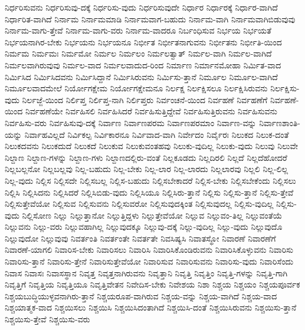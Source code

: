 {ನಿರ್ಧರಿಸುವನು
ನಿರ್ಧರಿಸುವು-ದಕ್ಕೆ
ನಿರ್ಧರಿಸು-ವುದು
ನಿರ್ಧರಿಸುವುದೇ
ನಿರ್ಧಾರ
ನಿರ್ಧಾರಕ್ಕೆ
ನಿರ್ಧಾರ-ವಾಗಿದೆ
ನಿರ್ಧಾರಿತ-ವಾಗಿದೆ
ನಿರ್ನಾಮ
ನಿರ್ನಾಮಮಾಡಿ
ನಿರ್ನಾಮವಾಗ-ಬಹುದು
ನಿರ್ನಾಮ-ವಾಗಿ
ನಿರ್ನಾಮವಾಗಿಬಿಡುವುವು
ನಿರ್ನಾಮ-ವಾಗು-ತ್ತೇವೆ
ನಿರ್ನಾಮ-ವಾಗು-ವರು
ನಿರ್ನಾಮ-ವಾದರೂ
ನಿರ್ಬಂಧಿಸುವ
ನಿರ್ಭಯ
ನಿರ್ಭಯತೆ
ನಿರ್ಭಯನಾಗಿರ-ಬೇಕು
ನಿರ್ಭಯನು
ನಿರ್ಭಯನೂ
ನಿರ್ಭೀತ
ನಿರ್ಭೀತನಾಗುವನು
ನಿರ್ಭೀತನು
ನಿರ್ಭೀತಿ-ಯಿಂದ
ನಿರ್ಮಮ
ನಿರ್ಮಮಃ
ನಿರ್ಮಮೋ
ನಿರ್ಮಲ
ನಿರ್ಮಲಂ
ನಿರ್ಮಲತ್ವಾತ್
ನಿರ್ಮಲ-ವಾಗಿ
ನಿರ್ಮಲ-ವಾಗಿದೆ
ನಿರ್ಮಲವಾಗಿರುವುವು
ನಿರ್ಮಲ-ವಾದ
ನಿರ್ಮಲವಾದುದ-ರಿಂದ
ನಿರ್ಮಾಣ
ನಿರ್ಮಾನಮೋಹಾ
ನಿರ್ಮಿತ-ವಾದ
ನಿರ್ಮಿಸಿದ
ನಿರ್ಮಿಸಿದವನು
ನಿರ್ಮಿಸಿದ್ದಾನೆ
ನಿರ್ಮಿಸಿರುವನು
ನಿರ್ಮಿಸು-ತ್ತಾನೆ
ನಿರ್ಮೂಲ
ನಿರ್ಮೂಲ-ವಾಗಿದೆ
ನಿರ್ಮೂಲವಾದಮೇಲೆ
ನಿರ್ಯೋಗಕ್ಷೇಮ
ನಿರ್ಯೋಗಕ್ಷೇಮನೂ
ನಿರ್ಲಕ್ಷ
ನಿರ್ಲಕ್ಷಿಸಲೂ
ನಿರ್ಲಕ್ಷಿಸಿರುವನು
ನಿರ್ಲಕ್ಷಿಸು-ವುದು
ನಿರ್ಲಜ್ಜೆ-ಯಿಂದ
ನಿರ್ಲಿಪ್ತ
ನಿರ್ಲಿಪ್ತ-ನಾಗಿ
ನಿರ್ಲಿಪ್ತರು
ನಿರ್ವಂಚನೆ-ಯಿಂದ
ನಿರ್ವಹಣೆ
ನಿರ್ವಹಣೆಗೆ
ನಿರ್ವಹಣೆ-ಯಿಂದ
ನಿರ್ವಹಣೆಯೇ
ನಿರ್ವಹಿಸಲಿ
ನಿರ್ವಹಿಸಿದರೆ
ನಿರ್ವಹಿಸುತ್ತಿದ್ದೇವೆ
ನಿರ್ವಹಿಸುತ್ತಿರುವನು
ನಿರ್ವಹಿಸುವನು
ನಿರ್ವಹಿಸು-ವರು
ನಿರ್ವಹಿಸುವು-ದಕ್ಕೆ
ನಿರ್ವಾಣ
ನಿರ್ವಾಣಪರಮ
ನಿರ್ವಾಣಪರಮಾಂ
ನಿರ್ವಾಣ-ವನ್ನು
ನಿರ್ವಾಣಶಾಂತಿ-ಯನ್ನು
ನಿರ್ವಾಹವಿಲ್ಲದೆ
ನಿರ್ವಿಕಲ್ಪ
ನಿರ್ವಿಕಾರನೂ
ನಿರ್ವಿವಾದ-ವಾಗಿ
ನಿರ್ವೇದಂ
ನಿರ್ವೈರಃ
ನಿಲುಕದ
ನಿಲುಕ-ದಂತೆ
ನಿಲುಕದವನು
ನಿಲುಕದುದೆ
ನಿಲುಕದೆ
ನಿಲುಕುವ
ನಿಲುಕುವಂತಹವು
ನಿಲುಕು-ವುದಿಲ್ಲ
ನಿಲುಕು-ವುದು
ನಿಲುವು
ನಿಲುವೇ
ನಿಲ್ದಾಣ
ನಿಲ್ದಾಣ-ಗಳನ್ನು
ನಿಲ್ದಾಣ-ಗಳು
ನಿಲ್ದಾಣದಲ್ಲಿರು-ವಂತೆ
ನಿಲ್ಲಕೂಡದು
ನಿಲ್ಲದಿರಲಿ
ನಿಲ್ಲದೆ
ನಿಲ್ಲದೆಹೋದರೆ
ನಿಲ್ಲಬಲ್ಲನೋ
ನಿಲ್ಲಬಲ್ಲವು
ನಿಲ್ಲ-ಬಹುದು
ನಿಲ್ಲ-ಬೇಕು
ನಿಲ್ಲ-ಲಾರ
ನಿಲ್ಲ-ಲಾರದು
ನಿಲ್ಲಲಾರವು
ನಿಲ್ಲಲಿ
ನಿಲ್ಲ-ಲಿಲ್ಲ
ನಿಲ್ಲ-ವುದು
ನಿಲ್ಲಿಸ
ನಿಲ್ಲಿಸದೇ
ನಿಲ್ಲಿಸಬಲ್ಲ
ನಿಲ್ಲಿಸ-ಬಹುದು
ನಿಲ್ಲಿಸಬೇಕಾದರೆ
ನಿಲ್ಲಿಸ-ಬೇಕು
ನಿಲ್ಲಿಸಬೇಕೆಂದು
ನಿಲ್ಲಿಸಲು
ನಿಲ್ಲಿಸಿ
ನಿಲ್ಲಿಸಿದನು
ನಿಲ್ಲಿಸಿದರೆ
ನಿಲ್ಲಿಸಿಬಿಡು-ವುದು
ನಿಲ್ಲಿಸಿಯೂ
ನಿಲ್ಲಿಸಿರು-ತ್ತಾನೆ
ನಿಲ್ಲಿಸು
ನಿಲ್ಲಿಸು-ತ್ತಾನೆ
ನಿಲ್ಲಿಸು-ತ್ತೇವೆ
ನಿಲ್ಲಿಸುತ್ತೇವೆಯೋ
ನಿಲ್ಲಿಸುವ
ನಿಲ್ಲಿಸುವನು
ನಿಲ್ಲಿಸುವರೋ
ನಿಲ್ಲಿಸುವುದಕ್ಕಿಂತ
ನಿಲ್ಲಿಸುವುದಲ್ಲ
ನಿಲ್ಲಿಸು-ವುದಿಲ್ಲ
ನಿಲ್ಲಿಸು-ವುದು
ನಿಲ್ಲಿಸೋಣ
ನಿಲ್ಲು
ನಿಲ್ಲುತ್ತಾನೋ
ನಿಲ್ಲುತ್ತಿದ್ದಳು
ನಿಲ್ಲುತ್ತೇವೆಯೋ
ನಿಲ್ಲುವ
ನಿಲ್ಲುವಂ-ತಿಲ್ಲ
ನಿಲ್ಲುವಂತೆಯೆ
ನಿಲ್ಲುವನು
ನಿಲ್ಲು-ವರು
ನಿಲ್ಲುವಹಾಗಿಲ್ಲ
ನಿಲ್ಲುವುದಕ್ಕೂ
ನಿಲ್ಲುವು-ದಕ್ಕೆ
ನಿಲ್ಲು-ವುದಿಲ್ಲ
ನಿಲ್ಲು-ವುದು
ನಿಲ್ಲುವುದೊ
ನಿಲ್ಲುವುದೋ
ನಿಲ್ಲುವುವು
ನಿವರ್ತಂತಿ
ನಿವರ್ತಂತೇ
ನಿವರ್ತತೇ
ನಿವಸಿಷ್ಯಸಿ
ನಿವಾತಸ್ಥೋ
ನಿವಾರಣೆ
ನಿವಾರಣೆಗೆ
ನಿವಾರಣೆ-ಯಾಗಲಿ
ನಿವಾರಿಸ-ಬೇಕು
ನಿವಾರಿಸಲು
ನಿವಾರಿಸಿ
ನಿವಾರಿಸಿಕೊಂಡಿರುವನು
ನಿವಾರಿಸಿಕೊಳ್ಳುವನು
ನಿವಾರಿಸು
ನಿವಾರಿಸು-ತ್ತಾನೆ
ನಿವಾರಿಸು-ತ್ತೇನೆ
ನಿವಾರಿಸುತ್ತೇವೆಯೋ
ನಿವಾರಿಸುವ
ನಿವಾರಿಸುವನು
ನಿವಾರಿಸು-ವುದು
ನಿವಾರಿಸೆಂದು
ನಿವಾಸ
ನಿವಾಸಃ
ನಿವಾಸಸ್ಥಾನ
ನಿವೃತ್ತ
ನಿವೃತ್ತನಾಗಿರುವನು
ನಿವೃತ್ತಾನಿ
ನಿವೃತ್ತಿ
ನಿವೃತ್ತಿಂ
ನಿವೃತ್ತಿ-ಗಳನ್ನು
ನಿವೃತ್ತಿ-ಗಾಗಿ
ನಿವೃತ್ತಿಗೆ
ನಿವೃತ್ತಿಯ
ನಿವೃತ್ತಿಯೂ
ನಿವೃತ್ತಿವೇತನ
ನಿವೇದಿಸ-ಬೇಕು
ನಿವೇಶಯ
ನಿಶಾ
ನಿಶ್ಚಯ
ನಿಶ್ಚಯಂ
ನಿಶ್ಚಯಪೂರ್ವಕ
ನಿಶ್ಚಯಬುದ್ಧಿಯುಳ್ಳವನಾಗಿರು-ತ್ತಾನೆ
ನಿಶ್ಚಯರೂಪ-ವಾಗಿರುವ
ನಿಶ್ಚಯ-ವನ್ನು
ನಿಶ್ಚಯ-ವಾಗಿದೆ
ನಿಶ್ಚಯ-ವಾದ
ನಿಶ್ಚಯಾತ್ಮಕ-ವಾದ
ನಿಶ್ಚಯಿಸಲು
ನಿಶ್ಚಯಿಸಿ
ನಿಶ್ಚಯಿಸಿದಂತಾಗಿದೆ
ನಿಶ್ಚಯಿಸಿ-ದಂತೆ
ನಿಶ್ಚಯಿಸಿರುವನು
ನಿಶ್ಚಯಿಸು-ತ್ತಾನೆ
ನಿಶ್ಚಯಿಸು-ತ್ತೇವೆ
ನಿಶ್ಚಯಿಸು-ವರು
}
